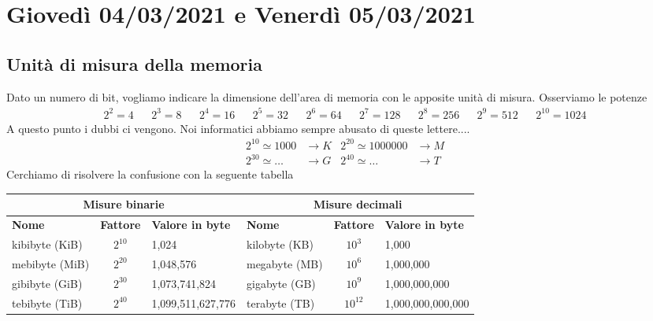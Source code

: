 \documentclass[11pt]{report}
\theoremstyle{definition}
\begin{document}
\chapter{Giovedì 04/03/2021 e Venerdì 05/03/2021}
\section{Unità di misura della memoria} Dato un numero di bit, vogliamo indicare la dimensione dell'area di memoria con le apposite unità di misura. Osserviamo le potenze
\begin{align*}2^2=4&&2^3=8&&2^4=16&&2^5=32&&2^6=64&&2^7=128&&2^8=256&&2^9=512&&\boxed{2^{10}=1024}\end{align*}
A questo punto i dubbi ci vengono. Noi informatici abbiamo sempre abusato di queste lettere....
\begin{align*}
2^{10}\simeq 1000 &\longrightarrow K&2^{20}\simeq 1000000 &\longrightarrow M\\
2^{30}\simeq \dots &\longrightarrow G&2^{40}\simeq \dots &\longrightarrow T
\end{align*}
Cerchiamo di risolvere la confusione con la seguente tabella\begin{center}\begin{tabular}{ |l|c|l|l|c|l|} \hline\multicolumn{3}{|c|}{\textbf{Misure binarie}} & \multicolumn{3}{c|}{\textbf{Misure decimali}} \\\hline\textbf{Nome} & \textbf{Fattore} & \textbf{Valore in byte} & \textbf{Nome} & \textbf{Fattore} & \textbf{Valore in byte}\\\hline
 kibibyte (KiB) & $2^{10}$ & 1,024 & kilobyte (KB) & ${10}^3$ & 1,000\\ 
 \hline
 mebibyte (MiB) & $2^{20}$ & 1,048,576 & megabyte (MB) & ${10}^6$  & 1,000,000\\ 
 \hline
 gibibyte (GiB) & $2^{30}$ & 1,073,741,824 & gigabyte (GB) & ${10}^9$  & 1,000,000,000\\ 
 \hline
 tebibyte (TiB) & $2^{40}$ & 1,099,511,627,776 & terabyte (TB) & ${10}^{12}$  & 1,000,000,000,000\\ 
 \hline
\end{tabular}
\end{center}
\end{document}
